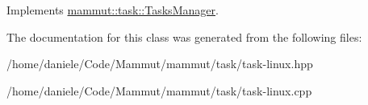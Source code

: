Implements \hyperlink{classmammut_1_1task_1_1TasksManager_af5ad5db5b43441a49e0a5633dd1ff667}{mammut\-::task\-::\-Tasks\-Manager}.



The documentation for this class was generated from the following files\-:\begin{DoxyCompactItemize}
\item 
/home/daniele/\-Code/\-Mammut/mammut/task/task-\/linux.\-hpp\item 
/home/daniele/\-Code/\-Mammut/mammut/task/task-\/linux.\-cpp\end{DoxyCompactItemize}
